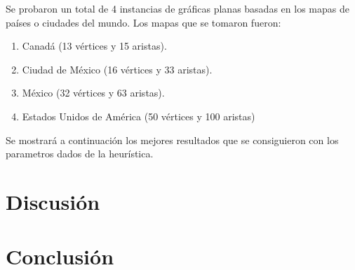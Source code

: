 \documentclass{article}
\begin{document}
  Se probaron un total de 4 instancias de gráficas planas basadas 
  en los mapas de países o ciudades del mundo. Los mapas que se tomaron
  fueron:

  \begin{enumerate}
    \item Canadá (13 vértices y 15 aristas).
    \item Ciudad de México (16 vértices y 33 aristas).
    \item México (32 vértices y 63 aristas).
    \item Estados Unidos de América (50 vértices y 100 aristas)
  \end{enumerate}

  Se mostrará a continuación los mejores resultados que se consiguieron
  con los parametros dados de la heurística.

  \section{Discusión} \label{discussion}

  \section{Conclusión} \label{conclussion}
  
\end{document}

